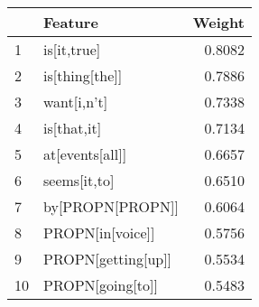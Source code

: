 \begin{tabular}{llr}
\toprule
{} &             Feature &  Weight \\
\midrule
1  &         is[it,true] &  0.8082 \\
2  &      is[thing[the]] &  0.7886 \\
3  &         want[i,n't] &  0.7338 \\
4  &         is[that,it] &  0.7134 \\
5  &     at[events[all]] &  0.6657 \\
6  &        seems[it,to] &  0.6510 \\
7  &    by[PROPN[PROPN]] &  0.6064 \\
8  &    PROPN[in[voice]] &  0.5756 \\
9  &  PROPN[getting[up]] &  0.5534 \\
10 &    PROPN[going[to]] &  0.5483 \\
\bottomrule
\end{tabular}
